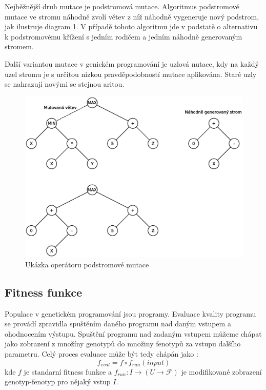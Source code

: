 Nejběžnější druh mutace je podstromová mutace. Algoritmus podstromové mutace ve stromu
náhodně zvolí větev z níž náhodně vygeneruje nový podstrom, jak ilustruje diagram
\ref{fig:subtree_mutation}. V případě tohoto algoritmu jde v podstatě o alternativu k
podstromovému křížení s jedním rodičem a jedním náhodně generovaným stromem.

Další variantou mutace v genickém programování je uzlová nutace, kdy na každý
uzel stromu je s určitou nizkou pravděpodobností mutace aplikována. Staré uzly
se nahrazují novými se stejnou aritou.

\begin{figure}[!ht]
	\centering
	\includegraphics[scale=0.6]{fig/subtree_mutation}	
	\caption{Ukázka operátoru podstromové mutace}
	\label{fig:subtree_mutation}
\end{figure}

\subsection{Fitness funkce}
Populace v genetickém programování jsou programy. Evaluace kvality programu se provádí
zpravidla spuštěním daného programu nad daným vstupem a ohodnocením výstupu. Spuštění 
programu nad zadaným vstupem můžeme chápat jako zobrazení z množíny genotypů do množiny
fenotypů za vstupu dalšího parametru. Celý proces evaluace může být tedy chápán jako :
$$ f_{eval} = f \circ f_{run}(input)$$
kde $f$ je standarní fitness funkce a $f_{run} : I \to (U \to \mathcal{F})$ je
modifikované zobrazení genotyp-fenotyp pro nějaký vstup $I$.

